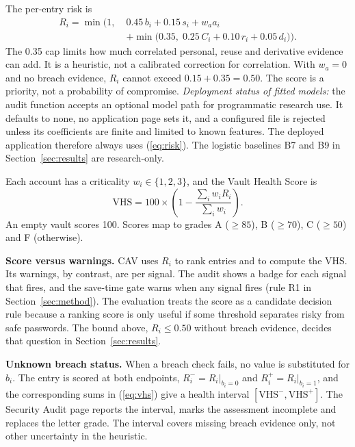 \documentclass[conference]{IEEEtran}
\begin{document}
The per-entry risk is
\begin{align}
R_i=\min\!\Big(1,\;&0.45\,b_i+0.15\,s_i+w_a a_i\nonumber\\
&+\min\big(0.35,\;0.25\,C_i+0.10\,r_i+0.05\,d_i\big)\Big).
\label{eq:risk}
\end{align}
The 0.35 cap limits how much correlated personal, reuse and derivative evidence can add. It is a heuristic, not a calibrated correction for correlation. With $w_a=0$ and no breach evidence, $R_i$ cannot exceed $0.15+0.35=0.50$. The score is a priority, not a probability of compromise. \emph{Deployment status of fitted models:} the audit function accepts an optional model path for programmatic research use. It defaults to none, no application page sets it, and a configured file is rejected unless its coefficients are finite and limited to known features. The deployed application therefore always uses (\ref{eq:risk}). The logistic baselines B7 and B9 in Section~\ref{sec:results} are research-only.

Each account has a criticality $w_i\in\{1,2,3\}$, and the Vault Health Score is
\begin{equation}
\mathrm{VHS}=100\times\left(1-\frac{\sum_i w_i R_i}{\sum_i w_i}\right).
\label{eq:vhs}
\end{equation}
An empty vault scores 100. Scores map to grades A ($\geq 85$), B ($\geq 70$), C ($\geq 50$) and F (otherwise).

\textbf{Score versus warnings.} CAV uses $R_i$ to rank entries and to compute the VHS. Its warnings, by contrast, are per signal. The audit shows a badge for each signal that fires, and the save-time gate warns when any signal fires (rule R1 in Section~\ref{sec:method}). The evaluation treats the score as a candidate decision rule because a ranking score is only useful if some threshold separates risky from safe passwords. The bound above, $R_i\leq 0.50$ without breach evidence, decides that question in Section~\ref{sec:results}.

\textbf{Unknown breach status.} When a breach check fails, no value is substituted for $b_i$. The entry is scored at both endpoints, $R_i^{-}=R_i|_{b_i=0}$ and $R_i^{+}=R_i|_{b_i=1}$, and the corresponding sums in (\ref{eq:vhs}) give a health interval $[\mathrm{VHS}^{-},\mathrm{VHS}^{+}]$. The Security Audit page reports the interval, marks the assessment incomplete and replaces the letter grade. The interval covers missing breach evidence only, not other uncertainty in the heuristic.
\end{document}
